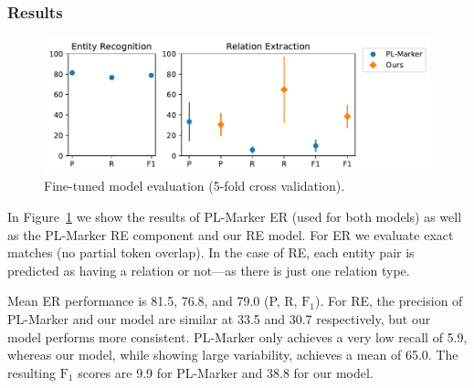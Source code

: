 
\subsubsection{Results}



\begin{figure}[tb]
  \centering
  \includegraphics[width=.8\linewidth]{figures/ref_params/fine_tuned_eval}
  \caption{Fine-tuned model evaluation (5-fold cross validation).}
  \label{fig:finetunedeval}
\end{figure}

In Figure~\ref{fig:finetunedeval} we show the results of PL-Marker ER (used for both models) as well as the PL-Marker RE component and our RE model. For ER we evaluate exact matches (no partial token overlap). In the case of RE, each entity pair is predicted as having a relation or not---as there is just one relation type.

Mean ER performance is 81.5, 76.8, and 79.0 (P, R, $\text{F}_1$). For RE, the precision of PL-Marker and our model are similar at 33.5 and 30.7 respectively, but our model performs more consistent. PL-Marker only achieves a very low recall of 5.9, whereas our model, while showing large variability, achieves a mean of 65.0. The resulting $\text{F}_1$ scores are 9.9 for PL-Marker and 38.8 for our model.


